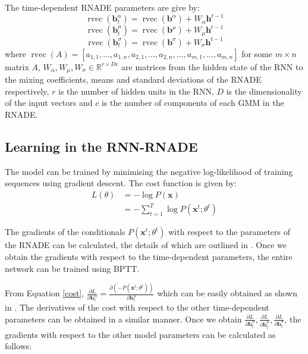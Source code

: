 \documentclass{article} %
\DeclareMathOperator{\rvec}{rvec}
\begin{document}
The time-dependent RNADE parameters are give by:
\begin{equation}
\label{one}
\rvec(\mathbf{b}^{\alpha}_{t}) = \rvec(\mathbf{b}^{\alpha}) + W_{\alpha}\mathbf{h}^{t-1}
\end{equation}
\begin{equation}
\label{two}
\rvec(\mathbf{b}^{\mu}_{t}) = \rvec(\mathbf{b}^{\mu}) + W_{\mu}\mathbf{h}^{t-1}
\end{equation}
\begin{equation}
\label{three}
\rvec(\mathbf{b}^{\sigma}_{t}) = \rvec(\mathbf{b}^{\sigma}) + W_{\sigma}\mathbf{h}^{t-1}
\end{equation}
where $\rvec(A) = [a_{1,1}, ..., a_{1,n}, a_{2,1}, ..., a_{2,n}, ..., a_{m,1}, ..., a_{m,n}]$ for some $m \times n$ matrix $A$, $W_{\alpha},W_{\mu},W_{\sigma} \in \mathbb{R}^{r \times D c}$ are matrices from the hidden state of the RNN to the mixing coefficients, means and standard deviations of the RNADE respectively, $r$ is the number of hidden units in the RNN, $D$ is the dimensionality of the input vectors and $c$ is the number of components of each GMM in the RNADE. 


\subsection{Learning in the RNN-RNADE}

The model can be trained by minimising the negative log-likelihood of training sequences using gradient descent. The cost function is given by:
\begin{align}
L(\theta) &= - \log P(\mathbf{x}) \nonumber\\ 
&= -\sum_{t=1}^{T} \log P(\mathbf{x}^t;\theta^t) \label{cost}
\end{align}

The gradients of the conditionals $P(\mathbf{x}^t;\theta^t)$ with respect to the parameters of the RNADE can be calculated, the details of which are outlined in \cite{Uria2013}. Once we obtain the gradients with respect to the time-dependent parameters, the entire network can be trained using BPTT. 

From Equation \ref{cost}, $\frac{\partial L}{\partial \mathbf{b}^{\alpha}_{t}} = \frac{\partial (-P(\mathbf{x}^t;\theta^t))}{\partial \mathbf{b}^{\alpha}_{t}}$ which can be easily obtained as shown in \cite{Uria2013}. The derivatives of the cost with respect to the other time-dependent parameters can be obtained in a similar manner. Once we obtain $ \frac{\partial L}{\partial \mathbf{b}^{\alpha}_{t}}, \frac{\partial L}{\partial \mathbf{b}^{\mu}_{t}}, \frac{\partial L}{\partial \mathbf{b}^{\sigma}_{t}}$, the gradients with respect to the other model parameters can be calculated as follows:
\end{document}
